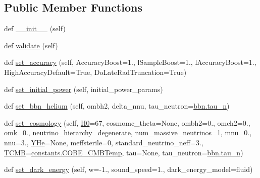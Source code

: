 \subsection*{Public Member Functions}
\begin{DoxyCompactItemize}
\item 
def \mbox{\hyperlink{classcamb_1_1model_1_1CAMBparams_a05cb8fd65b1025a09c5f3564710e007b}{\+\_\+\+\_\+init\+\_\+\+\_\+}} (self)
\item 
def \mbox{\hyperlink{classcamb_1_1model_1_1CAMBparams_a25e629d6a0c1ff3c6ba9d6de2a8ef8fb}{validate}} (self)
\item 
def \mbox{\hyperlink{classcamb_1_1model_1_1CAMBparams_a05a8e61eca1a78d1f19408dd9530672e}{set\+\_\+accuracy}} (self, Accuracy\+Boost=1., l\+Sample\+Boost=1., l\+Accuracy\+Boost=1., High\+Accuracy\+Default=True, Do\+Late\+Rad\+Truncation=True)
\item 
def \mbox{\hyperlink{classcamb_1_1model_1_1CAMBparams_a02d9cef6eef7569886bd8625e4d465f6}{set\+\_\+initial\+\_\+power}} (self, initial\+\_\+power\+\_\+params)
\item 
def \mbox{\hyperlink{classcamb_1_1model_1_1CAMBparams_a4dba2e237590bea1b9363d9aa0665c03}{set\+\_\+bbn\+\_\+helium}} (self, ombh2, delta\+\_\+nnu, tau\+\_\+neutron=\mbox{\hyperlink{namespacecamb_1_1bbn_ae95abe1177100ca3b8cfb59cf9e379be}{bbn.\+tau\+\_\+n}})
\item 
def \mbox{\hyperlink{classcamb_1_1model_1_1CAMBparams_a2cc8871c90745590e02d61f2c731100c}{set\+\_\+cosmology}} (self, \mbox{\hyperlink{classcamb_1_1model_1_1CAMBparams_a8ff1806ce4bce8beee6ac5e305d79b5d}{H0}}=67, cosmomc\+\_\+theta=None, ombh2=0., omch2=0., omk=0., neutrino\+\_\+hierarchy=\textquotesingle{}degenerate\textquotesingle{}, num\+\_\+massive\+\_\+neutrinos=1, mnu=0., nnu=3., \mbox{\hyperlink{classcamb_1_1model_1_1CAMBparams_a54a670bce83f5d6598fba3d39ab0b122}{Y\+He}}=None, meffsterile=0, standard\+\_\+neutrino\+\_\+neff=3., \mbox{\hyperlink{classcamb_1_1model_1_1CAMBparams_a1423460bd44a740728bf2e05fa63f443}{T\+C\+MB}}=\mbox{\hyperlink{namespacecamb_1_1constants_a021083fae909f391c578458f5ddafc75}{constants.\+C\+O\+B\+E\+\_\+\+C\+M\+B\+Temp}}, tau=None, tau\+\_\+neutron=\mbox{\hyperlink{namespacecamb_1_1bbn_ae95abe1177100ca3b8cfb59cf9e379be}{bbn.\+tau\+\_\+n}})
\item 
def \mbox{\hyperlink{classcamb_1_1model_1_1CAMBparams_a59530c15dc52ae15a94c678dbac52e24}{set\+\_\+dark\+\_\+energy}} (self, w=-\/1., sound\+\_\+speed=1., dark\+\_\+energy\+\_\+model=\textquotesingle{}fluid\textquotesingle{})

\end{DoxyCompactItemize}
